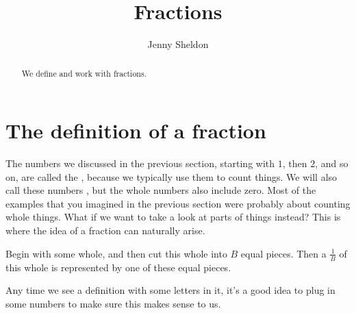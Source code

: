 \documentclass{ximera}
\title{Fractions}
\author{Jenny Sheldon}
\begin{document}
\begin{abstract}
We define and work with fractions.
\end{abstract}
\maketitle





\section{The definition of a fraction}

The numbers we discussed in the previous section, starting with $1$, then $2$, and so on, are called the , because we typically use them to count things. We will also call these numbers , but the whole numbers also include zero. Most of the examples that you imagined in the previous section were probably about counting whole things. What if we want to take a look at parts of things instead? This is where the idea of a fraction can naturally arise. 

\begin{definition}
Begin with some whole, and then cut this whole into $B$ equal pieces. Then a  $\frac{1}{B}$ of this whole is represented by one of these equal pieces.
\end{definition}
Any time we see a definition with some letters in it, it's a good idea to plug in some numbers to make sure this makes sense to us.
\end{document}
